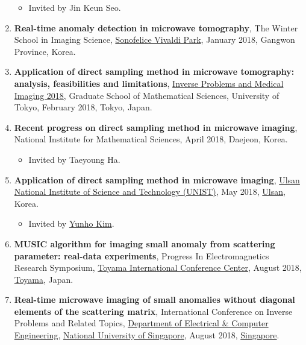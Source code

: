 \documentclass[10pt,A4]{article}
\begin{document}
\begin{enumerate}
\begin{itemize}
\item Invited by Jin Keun Seo.
\end{itemize}
\item\label{P-WSIS2018} \textbf{Real-time anomaly detection in microwave tomography}, The  Winter School in Imaging Science, \href{https://www.sonohotelsresorts.com/web/dm_english/html/09sonofelice_english_sub_01_01.html}{Sonofelice Vivaldi Park}, January 2018, Gangwon Province, Korea.
\item\label{P-DSM2018A} \textbf{Application of direct sampling method in microwave tomography: analysis, feasibilities and limitations}, \href{http://faculty.ms.u-tokyo.ac.jp/~a3inverse/InvMed2018/}{Inverse Problems and Medical Imaging 2018}, Graduate School of Mathematical Sciences, University of Tokyo, February 2018, Tokyo, Japan.
\item\label{P-DSM2018B} \textbf{Recent progress on direct sampling method in microwave imaging}, National Institute for Mathematical Sciences, April 2018, Daejeon, Korea.
\begin{itemize}
\item Invited by Taeyoung Ha.
\end{itemize}
\item\label{P-DSM2018C} \textbf{Application of direct sampling method in microwave imaging}, \href{http://www.unist.ac.kr/}{Ulsan National Institute of Science and Technology (UNIST)}, May 2018, \href{http://www.ulsan.go.kr/english/index}{Ulsan}, Korea.
\begin{itemize}
\item Invited by \href{http://yunhokim.wordpress.com/}{Yunho Kim}.
\end{itemize}
\item\label{P-PIERS2018} \textbf{MUSIC algorithm for imaging small anomaly from scattering parameter: real-data experiments}, Progress In Electromagnetics Research Symposium, \href{http://www.ticc.co.jp/english/}{Toyama International Conference Center}, August 2018, \href{http://www.city.toyama.toyama.jp/english/English.html}{Toyama}, Japan.
\item\label{P-ICIP2018} \textbf{Real-time microwave imaging of small anomalies without diagonal elements of the scattering matrix}, International Conference on Inverse Problems and Related Topics, \href{https://www.ece.nus.edu.sg/}{Department of Electrical \& Computer Engineering}, \href{http://www.nus.edu.sg}{National University of Singapore}, August 2018, \href{https://www.gov.sg/}{Singapore}.

\end{enumerate}
\end{document}
